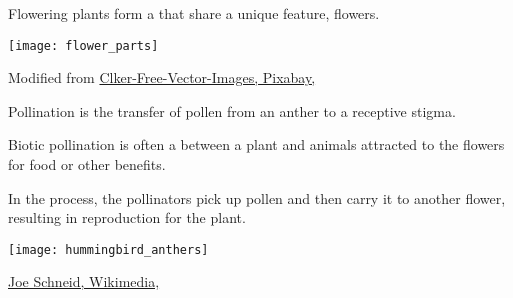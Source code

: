 \documentclass[t,hidelinks]{beamer}
\begin{document}
%		
%
\begin{frame}[t]{Flowering plants form a  that share a unique feature, flowers.}
	
	{\centering 
	\texttt{[image: flower\_parts]}
	}
	
	\vfilll
	
	\hfill \tiny Modified from \href{https://pixabay.com/en/diagram-flower-mature-anatomy-41571/}{Clker-Free-Vector-Images, Pixabay, \cc{}}
	
\end{frame}
%
\begin{frame}[t]{Pollination is the transfer of pollen from an anther to a receptive stigma.}

	\begin{multicols}{2}
	\hangpara Biotic pollination is often a  between a plant and animals attracted to the flowers for food or other benefits. 
	
	\hangpara In the process, the pollinators pick up pollen and then carry it to another flower, resulting in reproduction for the plant. 

	\columnbreak
	
	\texttt{[image: hummingbird\_anthers]}
	\end{multicols}
	
	\vfilll
	
	\hfill \tiny \href{https://commons.wikimedia.org/wiki/File:RubyThroatedHummingbird.jpg}{Joe Schneid, Wikimedia, } %
	
\end{frame}
%
\end{document}
